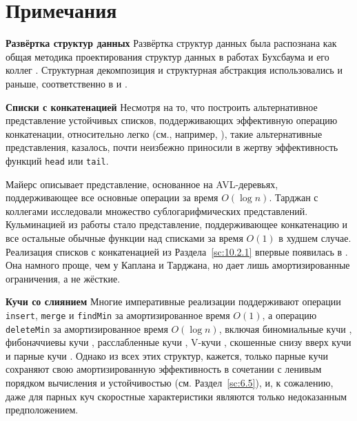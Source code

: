 \section{Примечания}
\label{sc:10.4}

\noindent
\textbf{Развёртка структур данных} Развёртка структур данных была
распознана как общая методика проектирования структур данных в
работах Бухсбаума и его коллег \cite{Buchsbaum1993,
  BuchsbaumTarjan1995, BuchsbaumSundarTarjan1995}. Структурная
декомпозиция и структурная абстракция использовались и раньше,
соответственно в \cite{Dietz1982} и \cite{DriscollSleatorTarjan1994}.

\noindent
\textbf{Списки с конкатенацией} Несмотря на то, что построить
альтернативное представление устойчивых списков, поддерживающих
эффективную операцию конкатенации, относительно легко (см., например,
\cite{Hughes1986}), такие альтернативные представления, казалось,
почти неизбежно приносили в жертву эффективность функций
\lstinline!head! или \lstinline!tail!.

Майерс \cite{Myers1982} описывает представление, основанное на
AVL-деревьях, поддерживающее все основные операции за время $O(\log
n)$. Тарджан с коллегами \cite{DriscollSleatorTarjan1994,
  BuchsbaumTarjan1995, KaplanTarjan1995} исследовали множество
сублогарифмических представлений. Кульминацией из работы стало
представление, поддерживающее конкатенацию и все остальные обычные
функции над списками за время $O(1)$ в худшем случае. Реализация
списков с конкатенацией из Раздела~\ref{sc:10.2.1} впервые появилась в
\cite{Okasaki1995a}. Она намного проще, чем у Каплана и Тарджана, но
дает лишь амортизированные ограничения, а не жёсткие.

\noindent
\textbf{Кучи со слиянием} Многие императивные реализации поддерживают
операции \lstinline!insert!, \lstinline!merge! и \lstinline!findMin!
за амортизированное время $O(1)$, а операцию \lstinline!deleteMin! за
амортизированное время $O(\log n)$, включая биномиальные кучи
\cite{KhoongLeong1993}, фибоначчиевы кучи \cite{FredmanTarjan1987},
расслабленные кучи \cite{Driscoll-etal1988}, V-кучи
\cite{Peterson1987}, скошенные снизу вверх кучи
\cite{SleatorTarjan1986b} и парные кучи
\cite{Fredman-etal1986}. Однако из всех этих структур, кажется, только
парные кучи сохраняют свою амортизированную эффективность в сочетании
с ленивым порядком вычисления и устойчивостью
(см. Раздел~\ref{sc:6.5}), и, к сожалению, даже для парных куч
скоростные характеристики являются только недоказанным предположением.

